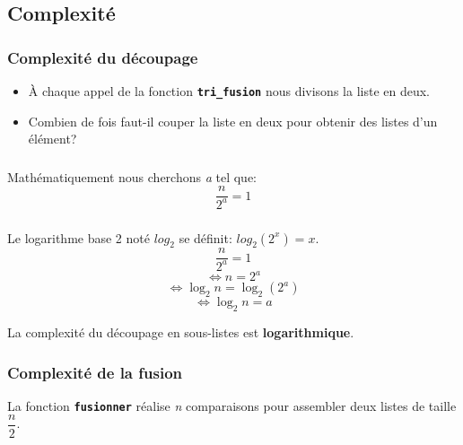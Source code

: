 \documentclass[svgnames,11pt]{beamer}
\begin{document}
\subsection{Complexité}
\begin{frame}
    \frametitle{Complexité du découpage}


    \begin{itemize}
        \item<1-> À chaque appel de la fonction \texttt{\textbf{tri\_fusion}} nous divisons la liste en deux.
        \item<2-> Combien de fois faut-il couper la liste en deux pour obtenir des listes d'un élément?
    \end{itemize}

\end{frame}
\begin{frame}
    \frametitle{}

    \begin{center}
        Mathématiquement nous cherchons \emph{a} tel que: {\Large $$\dfrac{n}{2^a}=1$$}
    \end{center}



\end{frame}
\begin{frame}
    \frametitle{}
    Le logarithme base 2 noté $log_2$ se définit: $log_2(2^x)=x$.
    $$\dfrac{n}{2^a}=1$$
    $$\Longleftrightarrow n=2^a$$
    $$\Longleftrightarrow \log_2 n = \log_2 (2^a)$$
    $$\Longleftrightarrow \log_2 n = a$$

    \begin{aretenir}[]
        La complexité du découpage en sous-listes est \textbf{logarithmique}.
    \end{aretenir}
\end{frame}
\begin{frame}
    \frametitle{Complexité de la fusion}

    La fonction \textbf{\texttt{fusionner}} réalise \emph{n} comparaisons pour assembler deux listes de taille $\dfrac{n}{2}$.

\end{frame}
\end{document}
